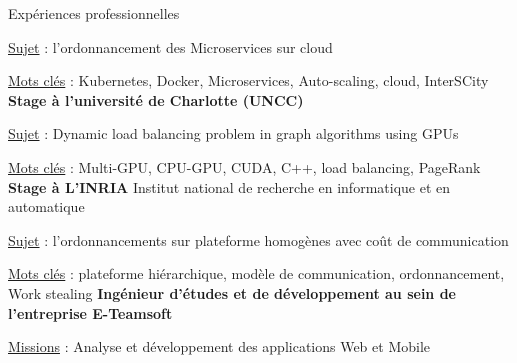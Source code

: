 \begin{rubric}{Expériences professionnelles}
     \hfill{} 
    \par \underline{Sujet} : l'ordonnancement des Microservices sur cloud
    \hfill {}
	\par \underline{Mots clés} : Kubernetes, Docker, Microservices, Auto-scaling, cloud, InterSCity
   \hfill {}
%
\entry*[]
 \textbf{Stage à l’université de Charlotte (UNCC)}
     \hfill{} 
	\par \underline{Sujet} : Dynamic load balancing problem in graph algorithms using GPUs
	\hfill {}
	\par \underline{Mots clés} : Multi-GPU, CPU-GPU, CUDA, C++, load balancing, PageRank
    \hfill {}
%
\entry*[]
    \textbf{Stage à L'INRIA} Institut national de recherche en informatique et en automatique
     \hfill{} 
	\par \underline{Sujet} : l'ordonnancements sur plateforme homogènes avec coût de communication
	\hfill {}
	\par \underline{Mots clés} : plateforme hiérarchique, modèle de communication, ordonnancement, Work stealing
    \hfill {}
%
%
\entry*[]
	\textbf{Ingénieur d'études et de développement au sein de l’entreprise E-Teamsoft}
     \hfill{} 
	\par \underline{Missions} : Analyse et développement des applications Web et Mobile 

\end{rubric}

